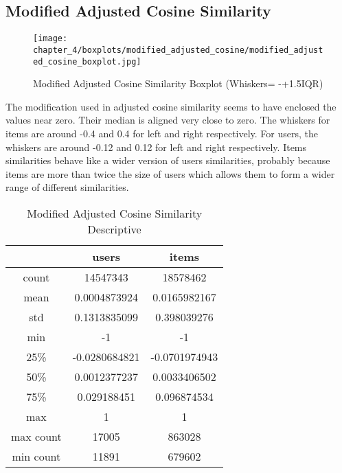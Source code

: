 \subsection{Modified Adjusted Cosine Similarity}

\begin{figure}[H]
\centering
\texttt{[image: chapter\_4/boxplots/modified\_adjusted\_cosine/modified\_adjusted\_cosine\_boxplot.jpg]}
\caption{Modified Adjusted Cosine Similarity Boxplot (Whiskers= -+1.5IQR)}
\label{figure:modified_adjusted_cosine_similarity_boxplot}
\end{figure}

The modification used in adjusted cosine similarity seems to have enclosed the values near zero.
Their median is aligned very close to zero. The whiskers for items are around -0.4 and 0.4
for left and right respectively. For users, the whiskers are around -0.12 and 0.12 for left and right
respectively. Items similarities behave like a wider version of users similarities, probably
because items are more than twice the size of users which allows them to form a wider range of
different similarities.

\begin{table}[H]
\centering
\caption{Modified Adjusted Cosine Similarity Descriptive}
\label{table:modified_adjusted_cosine_similarity_descriptive}
\begin{tabular}{|c|c|c|}
\hline
          & \textbf{users} & \textbf{items} \\ \hline
count     & 14547343       & 18578462       \\ \hline
mean      & 0.0004873924   & 0.0165982167   \\ \hline
std       & 0.1313835099   & 0.398039276    \\ \hline
min       & -1             & -1             \\ \hline
25\%      & -0.0280684821  & -0.0701974943  \\ \hline
50\%      & 0.0012377237   & 0.0033406502   \\ \hline
75\%      & 0.029188451    & 0.096874534    \\ \hline
max       & 1              & 1              \\ \hline
max count & 17005          & 863028         \\ \hline
min count & 11891          & 679602         \\ \hline
\end{tabular}
\end{table}

